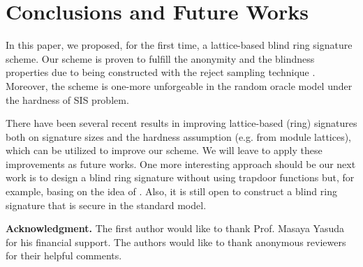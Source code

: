 \documentclass[runningheads]{llncs}
\begin{document}
\iffalse

\section{Discussion}
The paper \cite{WZZ18} proposed a new lattice-based ring signature scheme which is provably unforgeablility against adaptive chosen message in the random oracle model as an extension of the scheme without trapdoors. We would like to show that it seemed that there are some mistakes in the authors' argument, see \cite[Theorem 4.5, Case 2]{WZZ18}: Instead implying an equation resembling our Equation  \eqref{eq2} in form, the authors obtained 
\begin{equation*}\label{eq6}
\sum_{i \in [l]} \mathbf{A}_{i}(\mathbf{z}_{i}-\mathbf{z}'_{i}+\mathbf{S}_{i}(\mathbf{c}'-\mathbf{c}))=\textbf{0} \text{ (mod } q).
\end{equation*}

The paper \cite{ZJZ+18} tried to construct a new post-quantum blind signature based on the \textsf{SIS }problem. However, the authors used the hybrid arguments to prove its one-more property in which the random oracle is programmed to output the desired challenge. The approach seems not to be suitable in the context of the blind signature scheme proposed by the authors of \cite{ZJZ+18}. 

\fi
\section{Conclusions and Future Works}

In this paper, we proposed, for the first time, a lattice-based blind ring signature scheme. Our scheme is proven to fulfill the anonymity and the blindness properties due to being constructed with the reject sampling technique . Moreover, the scheme is one-more unforgeable in the random oracle model under the hardness of \textsf{SIS} problem. 

There have been several recent results in improving lattice-based (ring) signatures both on signature sizes and the hardness assumption (e.g. from module lattices), which can be utilized to improve our scheme. We will leave to apply these improvements as future works. One more interesting approach should be our next work is to design a blind ring signature without using trapdoor functions but, for example, basing on the idea of \cite{ABB+13}. Also, it is still open to construct a blind ring signature that is secure in the standard model. 

\textbf{Acknowledgment.} The first author would like to thank Prof. Masaya Yasuda for his financial support. The authors would like to thank anonymous reviewers for their helpful comments.  


\end{document}
